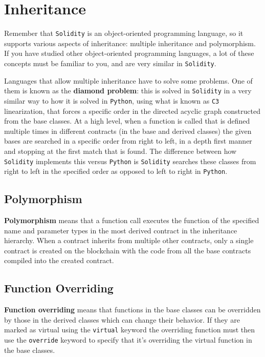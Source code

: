 \section{Inheritance}\label{inheritance}

Remember that \texttt{Solidity} is an object-oriented programming
language, so it supports various aspects of inheritance: multiple
inheritance and polymorphism. If you have studied other object-oriented
programming languages, a lot of these concepts must be familiar to you,
and are very similar in \texttt{Solidity}.

Languages that allow multiple inheritance have to solve some problems.
One of them is known as the \textbf{diamond problem}: this is solved in
\texttt{Solidity} in a very similar way to how it is solved in
\texttt{Python}, using what is known as \texttt{C3} linearization, that
forces a specific order in the directed acyclic graph constructed from
the base classes. At a high level, when a function is called that is
defined multiple times in different contracts (in the base and derived
classes) the given bases are searched in a specific order from right to
left, in a depth first manner and stopping at the first match that is
found. The difference between how \texttt{Solidity} implements this
versus \texttt{Python} is \texttt{Solidity} searches these classes from
right to left in the specified order as opposed to left to right in
\texttt{Python}.

\subsection{Polymorphism}\label{polymorphism}

\textbf{Polymorphism} means that a function call executes the function
of the specified name and parameter types in the most derived contract
in the inheritance hierarchy. When a contract inherits from multiple
other contracts, only a single contract is created on the blockchain
with the code from all the base contracts compiled into the created
contract.

\subsection{Function Overriding}\label{function-overriding}

\textbf{Function overriding} means that functions in the base classes
can be overridden by those in the derived classes which can change their
behavior. If they are marked as virtual using the \texttt{virtual}
keyword the overriding function must then use the \texttt{override}
keyword to specify that it's overriding the virtual function in the base
classes.

